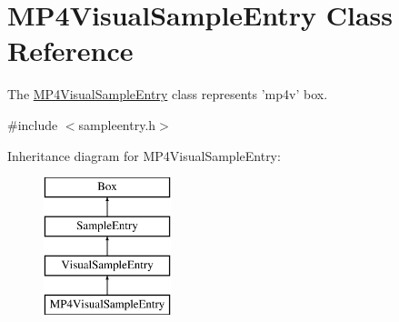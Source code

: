 \hypertarget{class_m_p4_visual_sample_entry}{\section{M\-P4\-Visual\-Sample\-Entry Class Reference}
\label{class_m_p4_visual_sample_entry}
}


The \hyperlink{class_m_p4_visual_sample_entry}{M\-P4\-Visual\-Sample\-Entry} class represents 'mp4v' box.  




{\ttfamily \#include $<$sampleentry.\-h$>$}

Inheritance diagram for M\-P4\-Visual\-Sample\-Entry\-:\begin{figure}[H]
\begin{center}
\leavevmode
\includegraphics[height=4.000000cm]{class_m_p4_visual_sample_entry}
\end{center}
\end{figure}
